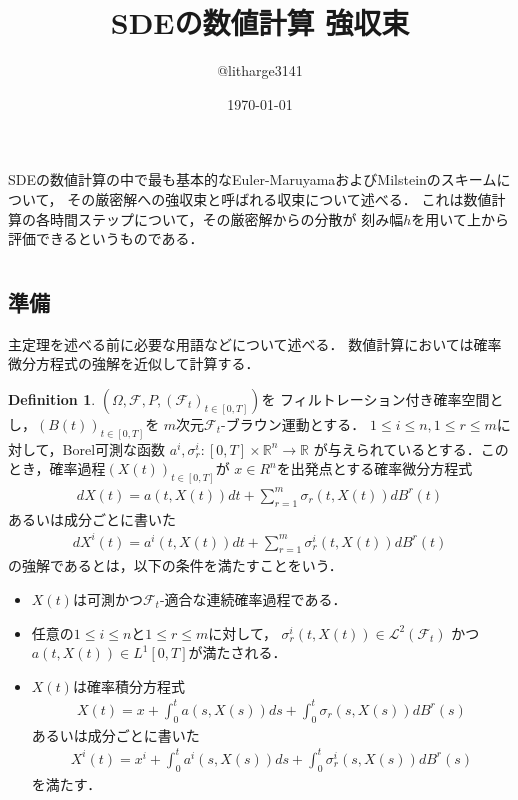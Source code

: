 \documentclass[dvipdfmx,autodetect-engine]{jsarticle}
\theoremstyle{remark}
\theoremstyle{definition}
\newtheorem{definition}{Definition}[section]
\newcommand{\R}{\mathbb{R}}
\begin{document}
\title{SDEの数値計算 強収束}
\author{@litharge3141}
\date{\today}
\maketitle

\abstract{}
SDEの数値計算の中で最も基本的なEuler-MaruyamaおよびMilsteinのスキームについて，
その厳密解への強収束と呼ばれる収束について述べる．
これは数値計算の各時間ステップについて，その厳密解からの分散が
刻み幅$h$を用いて上から評価できるというものである．

\section{}

\subsection{準備}
主定理を述べる前に必要な用語などについて述べる．
数値計算においては確率微分方程式の強解を近似して計算する．
\begin{definition}\label{strong_solution}
    $(\Omega,\mathcal{F},P,(\mathcal{F}_{t})_{t \in [0,T]})$を
    フィルトレーション付き確率空間とし，$(B(t))_{t \in [0,T]}$を
    $m$次元$\mathcal{F}_t$-ブラウン運動とする．
    $1\leq i\leq n, 1\leq r \leq m$に対して，Borel可測な函数
    $a^{i},\sigma_{r}^{i} \colon [0,T] \times \R^{n} \to \R$
    が与えられているとする．このとき，確率過程$(X(t))_{t \in [0,T]}$が
    $x \in R^{n}$を出発点とする確率微分方程式
    \begin{align}
        dX(t) = a(t,X(t)) dt + \sum_{r=1}^{m} \sigma_{r}(t,X(t)) d B^{r}(t)
    \end{align}
    あるいは成分ごとに書いた
    \begin{align}
        dX^{i} (t) = a^{i}(t,X(t)) dt + \sum_{r=1}^{m} \sigma_{r}^{i}(t,X(t)) dB^{r}(t)
    \end{align}
    の強解であるとは，以下の条件を満たすことをいう．
    \begin{itemize}
        \item $X(t)$は可測かつ$\mathcal{F}_t$-適合な連続確率過程である．
        \item 任意の$1\leq i\leq n$と$1\leq r\leq m$に対して，
        $\sigma_{r}^{i}(t,X(t)) \in \mathcal{L}^2(\mathcal{F}_t)$
        かつ$a(t,X(t)) \in L^1[0,T]$が満たされる．
        \item $X(t)$は確率積分方程式
        \begin{align}
            X(t) = x + \int_{0}^{t} a(s,X(s))ds + \int_{0}^{t} \sigma_{r}(s,X(s))dB^{r}(s)
        \end{align}
        あるいは成分ごとに書いた
        \begin{align}
            X^{i}(t) = x^{i} + \int_{0}^{t} a^{i}(s,X(s))ds + \int_{0}^{t} \sigma_{r}^{i}(s,X(s))dB^{r}(s)
        \end{align}
        を満たす．
    \end{itemize}
\end{definition}
\end{document}
